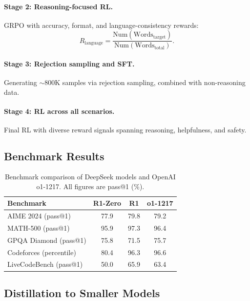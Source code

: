 \documentclass[12pt,a4paper]{report}
\begin{document}
\paragraph{Stage 2: Reasoning-focused RL.} GRPO with accuracy, format, and language-consistency rewards:
\begin{equation}
    R_{\text{language}} = \frac{\text{Num}(\text{Words}_{\text{target}})}{\text{Num}(\text{Words}_{\text{total}})}.
\end{equation}

\paragraph{Stage 3: Rejection sampling and SFT.} Generating $\sim$800K samples via rejection sampling, combined with non-reasoning data.

\paragraph{Stage 4: RL across all scenarios.} Final RL with diverse reward signals spanning reasoning, helpfulness, and safety.

\subsection{Benchmark Results}

\begin{table}[ht]
\centering
\caption{Benchmark comparison of DeepSeek models and OpenAI o1-1217. All figures are pass@1 (\%).}
\label{tab:deepseek-r1-results}
\begin{tabular}{lccc}
\toprule
\textbf{Benchmark} & \textbf{R1-Zero} & \textbf{R1} & \textbf{o1-1217} \\
\midrule
AIME 2024 (pass@1)       & 77.9  & 79.8  & 79.2 \\
MATH-500 (pass@1)        & 95.9  & 97.3  & 96.4 \\
GPQA Diamond (pass@1)    & 75.8  & 71.5  & 75.7 \\
Codeforces (percentile)  & 80.4  & 96.3  & 96.6 \\
LiveCodeBench (pass@1)   & 50.0  & 65.9  & 63.4 \\
\bottomrule
\end{tabular}
\end{table}

\subsection{Distillation to Smaller Models}
\end{document}

